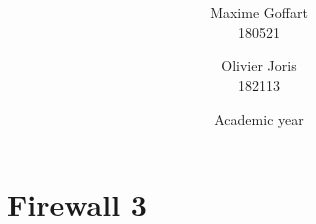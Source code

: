 \documentclass[a4paper, 11pt, oneside]{article}
\title{\ClassName\\\vspace*{0.8cm}\ProjectName\vspace{1cm}}
\author{Maxime Goffart \\180521 \and Olivier Joris\\182113}
\date{\vspace{1cm}Academic year \AcademicYear}
\begin{document}

\begin{titlingpage}
{\let\newpage\relax\maketitle}
\end{titlingpage}

\newpage


\section{Firewall 3}

\begin{table}[H]
  \begin{tabular}{|llllllll|}


\end{tabular}
\end{table}
\end{document}
